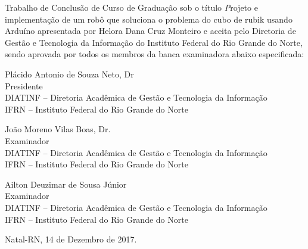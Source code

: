 \begin{folhadeaprovacao}
	\setlength{\ABNTsignthickness}{0.4pt}
	\setlength{\ABNTsignwidth}{10cm}
	
	\noindent 
	Trabalho de Conclusão de Curso de Graduação sob o título
	\textit Projeto e implementação de um robô que soluciona o problema do cubo de rubik usando Arduíno apresentada por Helora Dana Cruz Monteiro e aceita pelo Diretoria
	de Gestão e Tecnologia da Informação do Instituto Federal do Rio Grande do
	Norte, sendo aprovada por todos os membros da banca examinadora abaixo especificada:
		
	\assinatura
	{
		Plácido Antonio de Souza Neto, Dr  			                  \\
		{\small Presidente}											          \smallskip\\ 
		{\footnotesize
			DIATINF -- Diretoria Acadêmica de Gestão e Tecnologia da Informação		   \\
		  	IFRN -- Instituto Federal do Rio Grande do Norte
		}
   }
      
   \assinatura
	{
      João Moreno Vilas Boas, Dr.   			                  \\
		{\small Examinador}											          \smallskip\\ 
		{\footnotesize
			DIATINF -- Diretoria Acadêmica de Gestão e Tecnologia da Informação		   \\
		  	IFRN -- Instituto Federal do Rio Grande do Norte
		}
   }   
   
   \assinatura
	{
        Ailton Deuzimar de Sousa Júnior   			                  \\
		{\small Examinador}											          \smallskip\\ 
		{\footnotesize
		 DIATINF -- Diretoria Acadêmica de Gestão e Tecnologia da Informação		   \\
		 IFRN -- Instituto Federal do Rio Grande do Norte
		}
	}
		
	\vfill
	
	\begin{center}
		Natal-RN, 14 de Dezembro de 2017.
	\end{center}
\end{folhadeaprovacao}
